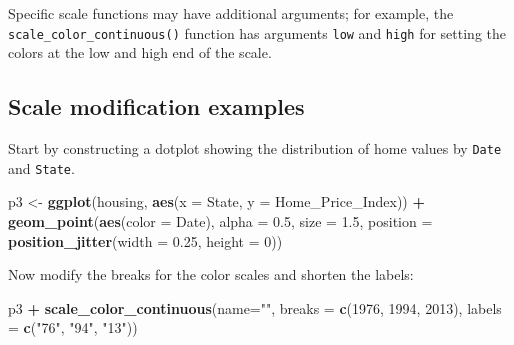 \documentclass[
]{book}
\newenvironment{Shaded}{\begin{snugshade}}{\end{snugshade}}
\newcommand{\DataTypeTok}[1]{\textcolor[rgb]{0.13,0.29,0.53}{#1}}
\newcommand{\DecValTok}[1]{\textcolor[rgb]{0.00,0.00,0.81}{#1}}
\newcommand{\FloatTok}[1]{\textcolor[rgb]{0.00,0.00,0.81}{#1}}
\newcommand{\KeywordTok}[1]{\textcolor[rgb]{0.13,0.29,0.53}{\textbf{#1}}}
\newcommand{\NormalTok}[1]{#1}
\newcommand{\OperatorTok}[1]{\textcolor[rgb]{0.81,0.36,0.00}{\textbf{#1}}}
\newcommand{\StringTok}[1]{\textcolor[rgb]{0.31,0.60,0.02}{#1}}
\begin{document}
Specific scale functions may have additional arguments; for example, the \texttt{scale\_color\_continuous()} function has arguments \texttt{low} and \texttt{high} for setting the colors at the low and high end of the scale.

\hypertarget{scale-modification-examples}{%
\subsection{Scale modification examples}\label{scale-modification-examples}}

Start by constructing a dotplot showing the distribution of home values by \texttt{Date} and \texttt{State}.

\begin{Shaded}
\begin{Highlighting}[]
\NormalTok{p3 \textless{}{-}}\StringTok{ }\KeywordTok{ggplot}\NormalTok{(housing, }\KeywordTok{aes}\NormalTok{(}\DataTypeTok{x =}\NormalTok{ State, }\DataTypeTok{y =}\NormalTok{ Home\_Price\_Index)) }\OperatorTok{+}\StringTok{ }
\StringTok{    }\KeywordTok{geom\_point}\NormalTok{(}\KeywordTok{aes}\NormalTok{(}\DataTypeTok{color =}\NormalTok{ Date), }\DataTypeTok{alpha =} \FloatTok{0.5}\NormalTok{, }\DataTypeTok{size =} \FloatTok{1.5}\NormalTok{,}
               \DataTypeTok{position =} \KeywordTok{position\_jitter}\NormalTok{(}\DataTypeTok{width =} \FloatTok{0.25}\NormalTok{, }\DataTypeTok{height =} \DecValTok{0}\NormalTok{))}
\end{Highlighting}
\end{Shaded}

Now modify the breaks for the color scales and shorten the labels:

\begin{Shaded}
\begin{Highlighting}[]
\NormalTok{p3 }\OperatorTok{+}\StringTok{ }
\StringTok{  }\KeywordTok{scale\_color\_continuous}\NormalTok{(}\DataTypeTok{name=}\StringTok{""}\NormalTok{,}
                         \DataTypeTok{breaks =} \KeywordTok{c}\NormalTok{(}\DecValTok{1976}\NormalTok{, }\DecValTok{1994}\NormalTok{, }\DecValTok{2013}\NormalTok{),}
                         \DataTypeTok{labels =} \KeywordTok{c}\NormalTok{(}\StringTok{"\textquotesingle{}76"}\NormalTok{, }\StringTok{"\textquotesingle{}94"}\NormalTok{, }\StringTok{"\textquotesingle{}13"}\NormalTok{))}
\end{Highlighting}
\end{Shaded}
\end{document}
